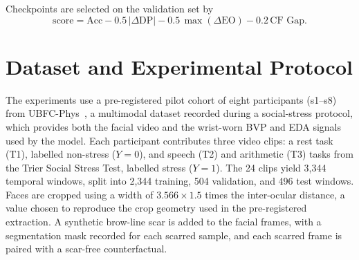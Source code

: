 Checkpoints are selected on the validation set by
\begin{equation}
\text{score} = \text{Acc} - 0.5\,|\Delta\text{DP}| - 0.5\,\max(\Delta\text{EO}) - 0.2\,\text{CF Gap}.
\end{equation}

\section{Dataset and Experimental Protocol}
The experiments use a pre-registered pilot cohort of eight participants (s1--s8) from UBFC-Phys~\cite{sabour2023}, a multimodal dataset recorded during a social-stress protocol, which provides both the facial video and the wrist-worn BVP and EDA signals used by the model. Each participant contributes three video clips: a rest task (T1), labelled non-stress ($Y = 0$), and speech (T2) and arithmetic (T3) tasks from the Trier Social Stress Test, labelled stress ($Y = 1$). The 24 clips yield 3,344 temporal windows, split into 2,344 training, 504 validation, and 496 test windows.
Faces are cropped using a width of $3.566 \times 1.5$ times the inter-ocular distance, a value chosen to reproduce the crop geometry used in the pre-registered extraction. A synthetic brow-line scar is added to the facial frames, with a segmentation mask recorded for each scarred sample, and each scarred frame is paired with a scar-free counterfactual.

